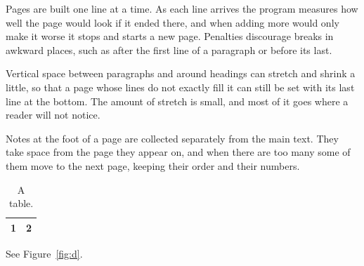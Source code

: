\documentclass{article}
\begin{document}
Pages are built one line at a time. As each line arrives the program measures how well the page would look if it ended there, and when adding more would only make it worse it stops and starts a new page. Penalties discourage breaks in awkward places, such as after the first line of a paragraph or before its last.

Vertical space between paragraphs and around headings can stretch and shrink a little, so that a page whose lines do not exactly fill it can still be set with its last line at the bottom. The amount of stretch is small, and most of it goes where a reader will not notice.

Notes at the foot of a page are collected separately from the main text. They take space from the page they appear on, and when there are too many some of them move to the next page, keeping their order and their numbers.
\begin{table}
\centering
\begin{tabular}{|c|c|}
\hline
1 & 2 \\
\hline
\end{tabular}
\caption{A table.}
\end{table}
See Figure~\ref{fig:d}.
\end{document}
